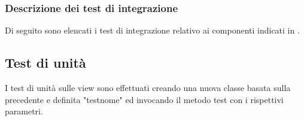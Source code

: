 \subsubsection{Descrizione dei test di integrazione}
Di seguito sono elencati i test di integrazione relativo ai componenti indicati in \infoST.
\subsection{Test di unità}
I test di unità sulle view sono effettuati creando una nuova classe basata sulla precedente e definita "testnome" ed invocando il metodo test con i rispettivi parametri.



